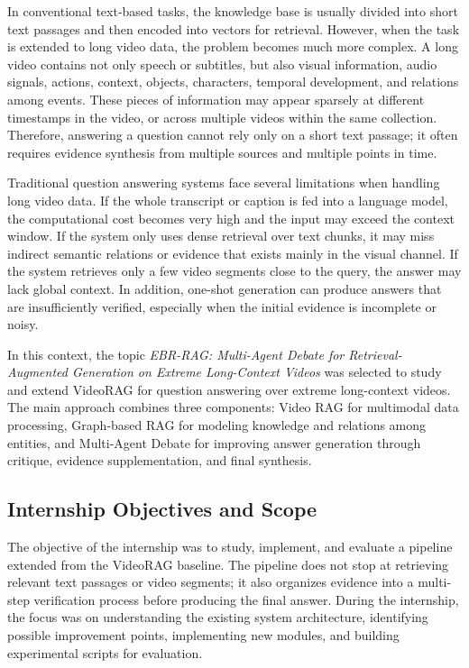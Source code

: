 \documentclass[12pt,a4paper]{article}
\begin{document}
In conventional text-based tasks, the knowledge base is usually divided into short text passages and then encoded into vectors for retrieval. However, when the task is extended to long video data, the problem becomes much more complex. A long video contains not only speech or subtitles, but also visual information, audio signals, actions, context, objects, characters, temporal development, and relations among events. These pieces of information may appear sparsely at different timestamps in the video, or across multiple videos within the same collection. Therefore, answering a question cannot rely only on a short text passage; it often requires evidence synthesis from multiple sources and multiple points in time.

Traditional question answering systems face several limitations when handling long video data. If the whole transcript or caption is fed into a language model, the computational cost becomes very high and the input may exceed the context window. If the system only uses dense retrieval over text chunks, it may miss indirect semantic relations or evidence that exists mainly in the visual channel. If the system retrieves only a few video segments close to the query, the answer may lack global context. In addition, one-shot generation can produce answers that are insufficiently verified, especially when the initial evidence is incomplete or noisy.

In this context, the topic \textit{EBR-RAG: Multi-Agent Debate for Retrieval-Augmented Generation on Extreme Long-Context Videos} was selected to study and extend VideoRAG for question answering over extreme long-context videos. The main approach combines three components: Video RAG for multimodal data processing, Graph-based RAG for modeling knowledge and relations among entities, and Multi-Agent Debate for improving answer generation through critique, evidence supplementation, and final synthesis.

\subsection{Internship Objectives and Scope}

The objective of the internship was to study, implement, and evaluate a pipeline extended from the VideoRAG baseline. The pipeline does not stop at retrieving relevant text passages or video segments; it also organizes evidence into a multi-step verification process before producing the final answer. During the internship, the focus was on understanding the existing system architecture, identifying possible improvement points, implementing new modules, and building experimental scripts for evaluation.
\end{document}
